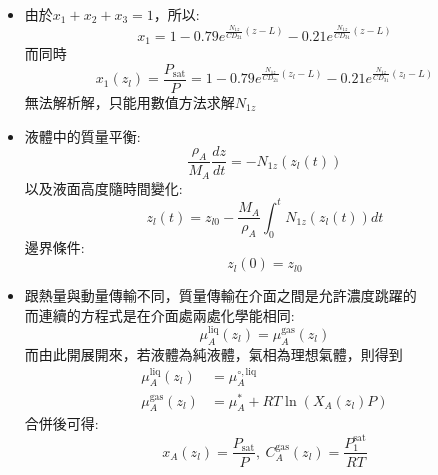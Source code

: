 \documentclass[../main.tex]{subfiles}
\begin{document}
\begin{itemize}
\begin{align}
  \end{align}
  \item 由於$x_1 + x_2 + x_3 = 1$，所以:
  \begin{equation}
    x_1 = 1 - 0.79 e^{\frac{N_{1z}}{C D_{21}} (z - L)} - 0.21 e^{\frac{N_{1z}}{C D_{31}} (z - L)}
  \end{equation}
  而同時
  \begin{equation}
    x_1(z_l) = \frac{P_{\text{sat}}}{P} = 1 - 0.79 e^{\frac{N_{1z}}{C D_{21}} (z_l - L)} - 0.21 e^{\frac{N_{1z}}{C D_{31}} (z_l - L)}
  \end{equation}
  無法解析解，只能用數值方法求解$N_{1z}$
  \item 液體中的質量平衡:
  \begin{equation}
    \frac{\rho_A}{M_A} \frac{dz}{dt} = -N_{1z}(z_l(t))
  \end{equation}
  以及液面高度隨時間變化:
  \begin{equation}
    z_l(t) = z_{l0} - \frac{M_A}{\rho_A} \int_0^t N_{1z}(z_l(t)) dt
  \end{equation}
  邊界條件:
  \begin{equation}
    z_l(0) = z_{l0}
  \end{equation}
  \item  跟熱量與動量傳輸不同，質量傳輸在介面之間是允許濃度跳躍的\\
  而連續的方程式是在介面處兩處化學能相同:
  \begin{equation}
    \mu_A^{\text{liq}} (z_l) = \mu_A^{\text{gas}} (z_l)
  \end{equation}
  而由此開展開來，若液體為純液體，氣相為理想氣體，則得到
  \begin{align}
    \mu_A^{\text{liq}} (z_l) &= \mu_A^{\circ,\text{liq}} \nonumber\\
    \mu_A^{\text{gas}} (z_l) &= \mu_A^{\ast} + RT \ln\left(X_A(z_l)P\right) 
  \end{align}
  合併後可得:
  \begin{equation}
    x_A(z_l) = \frac{P_{\text{sat}}}{P},~C_A^\text{gas}(z_l) = \frac{P_1^{\text{sat}}}{RT}
\end{equation}
\end{itemize}
\end{document}
